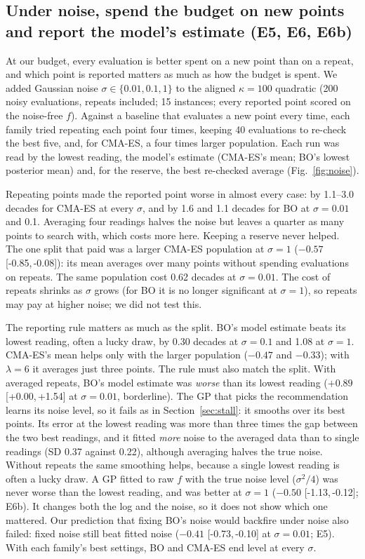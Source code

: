 \documentclass[10pt,a4paper]{article}
\newcommand{\ci}[2]{[#1,\,#2]}
\begin{document}
\subsection{Under noise, spend the budget on new points and report the model's estimate (E5, E6, E6b)}\label{sec:noise}
At our budget, every evaluation is better spent on a new point than on a repeat, and which point is
reported matters as much as how the budget is spent. We added Gaussian noise $\sigma\in\{0.01,0.1,1\}$ to the aligned
$\kappa=100$ quadratic (200 noisy evaluations, repeats included; 15 instances; every reported point scored on
the noise-free $f$). Against a baseline that evaluates a new point every time, each family tried repeating each
point four times, keeping 40 evaluations to re-check the best five, and, for CMA-ES, a four times larger
population. Each run was read by the lowest reading, the model's estimate (CMA-ES's mean; BO's lowest posterior
mean) and, for the reserve, the best re-checked average (Fig.~\ref{fig:noise}).

Repeating points made the reported point worse in almost every case: by 1.1--3.0 decades for CMA-ES at every
$\sigma$, and by 1.6 and 1.1 decades for BO at $\sigma=0.01$ and 0.1. Averaging four readings halves the noise but
leaves a quarter as many points to search with, which costs more here. Keeping a reserve never helped. The one split that paid was a larger CMA-ES population at $\sigma=1$
($-0.57$ \ci{-0.85}{-0.08}): its mean averages over many points without spending evaluations on repeats.
The same population cost 0.62 decades at $\sigma=0.01$. The cost of repeats shrinks as $\sigma$ grows
(for BO it is no longer significant at $\sigma=1$), so repeats may pay at higher noise; we did not test this.

The reporting rule matters as much as the split. BO's model estimate beats its lowest reading, often a lucky
draw, by 0.30 decades at $\sigma=0.1$ and 1.08 at $\sigma=1$. CMA-ES's mean helps
only with the larger population ($-0.47$ and $-0.33$); with $\lambda=6$ it averages just three points. The
rule must also match the split. With averaged repeats, BO's model estimate was \emph{worse} than its lowest
reading ($+0.89$ \ci{+0.00}{+1.54} at $\sigma=0.01$, borderline). The GP that picks the recommendation learns its
noise level, so it fails as in Section~\ref{sec:stall}: it smooths over its best points. Its error at the lowest
reading was more than three times the gap between the two best readings, and it fitted \emph{more} noise to the
averaged data than to single readings (SD 0.37 against 0.22), although averaging halves the true noise. Without
repeats the same smoothing helps, because a single lowest reading is often a lucky draw. A GP fitted to raw $f$
with the true noise level ($\sigma^2/4$) was never worse than the lowest reading, and was better at
$\sigma=1$ ($-0.50$ \ci{-1.13}{-0.12}; E6b). It changes both the log and the noise, so it does not show which
one mattered. Our prediction that fixing BO's noise would backfire under noise
also failed: fixed noise still beat fitted noise ($-0.41$ \ci{-0.73}{-0.10} at $\sigma=0.01$; E5). With each
family's best settings, BO and CMA-ES end level at every $\sigma$.
\end{document}
